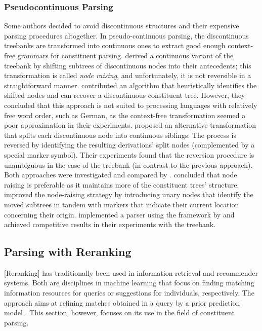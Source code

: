 \documentclass[../document.tex]{subfiles}
\begin{document}
    \subsubsection*{Pseudocontinuous Parsing}
    Some authors decided to avoid discontinuous structures and their expensive parsing procedures altogether.
    In pseudo-continuous parsing, the discontinuous treebanks are transformed into continuous ones to extract good enough context-free grammars for constituent parsing.
     derived a continuous variant of the \negra{} treebank by shifting subtrees of discontinuous nodes into their antecedents; this transformation is called \emph{node raising}, and unfortunately, it is not reversible in a straightforward manner.
     contributed an algorithm that heuristically identifies the shifted nodes and can recover a discontinuous constituent tree.
    However, they concluded that this approach is not suited to processing languages with relatively free word order, such as German, as the context-free transformation seemed a poor approximation in their experiments.
     proposed an alternative transformation that splits each discontinuous node into continuous siblings.
    The process is reversed by identifying the resulting derivations' split nodes (complemented by a special marker symbol).
    Their experiments found that the reversion procedure is unambiguous in the case of the \tiger{} treebank (in contrast to the previous approach).
    Both approaches were investigated and compared by \citet{hsu2010comparing}.
     concluded that node raising is preferable as it maintains more of the constituent trees' structure.
     improved the node-raising strategy by introducing unary nodes that identify the moved subtrees in tandem with markers that indicate their current location concerning their origin.
    \citeauthor{Ver16} implemented a parser using the  framework by \citet{Petrov06} and achieved competitive results in their experiments with the \tiger{} treebank.

    \subsection{Parsing with Reranking}\label{sec:references:reranking}
    [Reranking] has traditionally been used in information retrieval and recommender systems.
    Both are disciplines in machine learning that focus on finding matching information resources for queries or suggestions for individuals, respectively.
    The approach aims at refining matches obtained in a query by a prior prediction model \citep{carbonell1998use,adomavicius2009toward}.
    This section, however, focuses on its use in the field of constituent parsing.
\end{document}
